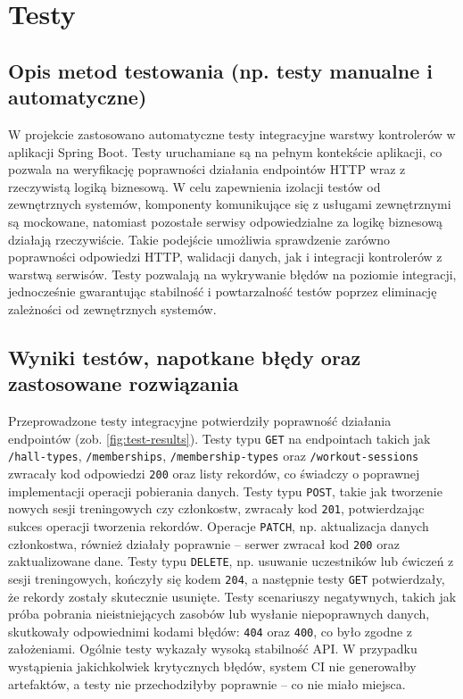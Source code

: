 \documentclass[../../spr.tex]{subfiles}
\begin{document}
\section{Testy}
\subsection{Opis metod testowania (np. testy manualne i automatyczne)}

W projekcie zastosowano automatyczne testy integracyjne warstwy kontrolerów w aplikacji Spring Boot.
Testy uruchamiane są na pełnym kontekście aplikacji,
co pozwala na weryfikację poprawności działania endpointów HTTP wraz z rzeczywistą logiką biznesową.
W celu zapewnienia izolacji testów od zewnętrznych systemów, komponenty komunikujące się z
usługami zewnętrznymi są mockowane, natomiast pozostałe serwisy odpowiedzialne za logikę biznesową
działają rzeczywiście. Takie podejście umożliwia sprawdzenie zarówno poprawności odpowiedzi HTTP,
walidacji danych, jak i integracji kontrolerów z warstwą serwisów.
Testy pozwalają na wykrywanie błędów na poziomie integracji, jednocześnie gwarantując stabilność
i powtarzalność testów poprzez eliminację zależności od zewnętrznych systemów.


\subsection{Wyniki testów, napotkane błędy oraz zastosowane rozwiązania}

Przeprowadzone testy integracyjne potwierdziły poprawność działania endpointów (zob. \ref{fig:test-results}).  
Testy typu \texttt{GET} na endpointach takich jak \texttt{/hall-types}, \texttt{/memberships}, \texttt{/membership-types} oraz \texttt{/workout-sessions} zwracały kod odpowiedzi \texttt{200} oraz listy rekordów, co świadczy o poprawnej implementacji operacji pobierania danych.
Testy typu \texttt{POST}, takie jak tworzenie nowych sesji treningowych czy członkostw, zwracały kod \texttt{201}, potwierdzając sukces operacji tworzenia rekordów.
Operacje \texttt{PATCH}, np. aktualizacja danych członkostwa, również działały poprawnie – serwer zwracał kod \texttt{200} oraz zaktualizowane dane.
Testy typu \texttt{DELETE}, np. usuwanie uczestników lub ćwiczeń z sesji treningowych, kończyły się kodem \texttt{204}, a następnie testy \texttt{GET} potwierdzały, że rekordy zostały skutecznie usunięte.
Testy scenariuszy negatywnych, takich jak próba pobrania nieistniejących zasobów lub wysłanie niepoprawnych danych, skutkowały odpowiednimi kodami błędów: \texttt{404} oraz \texttt{400}, co było zgodne z założeniami.
Ogólnie testy wykazały wysoką stabilność API. W przypadku wystąpienia jakichkolwiek krytycznych błędów, system CI nie generowałby artefaktów, a testy nie przechodziłyby poprawnie – co nie miało miejsca.
\end{document}
